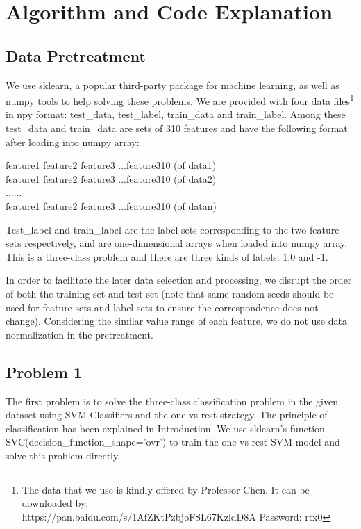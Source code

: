 \clearpage
\section{Algorithm and Code Explanation}

\subsection{Data Pretreatment}
We use sklearn, a popular third-party package for machine learning, as well as numpy tools to help solving these problems. We are provided with four data files\footnote{The data that we use is kindly offered by Professor Chen. It can be downloaded by:\\ https://pan.baidu.com/s/1AfZKtPzbjoFSL67KzldD8A \quad Password: rtx0} in npy format: test\_data, test\_label, train\_data and train\_label. Among these test\_data and train\_data are sets of 310 features and have the following format after loading into numpy array:

\begin{center}
feature1 feature2 feature3 ...feature310 (of data1)\\
feature1 feature2 feature3 ...feature310 (of data2)\\
......\\
feature1 feature2 feature3 ...feature310 (of datan)\\
\end{center}


Test\_label and train\_label are the label sets corresponding to the two feature sets respectively, and are one-dimensional arrays when loaded into numpy array. This is a three-class problem and there are three kinds of labels: 1,0 and -1.


In order to facilitate the later data selection and processing, we disrupt the order of both the training set and test set (note that same random seeds should be used for feature sets and label sets to ensure the correspondence does not change). Considering the similar value range of each feature, we do not use data normalization in the pretreatment.
\subsection{Problem 1}
The first problem is to solve the three-class classification problem in the given dataset using SVM Classifiers and the one-vs-rest strategy. The principle of classification has been explained in Introduction. We use sklearn's function SVC(decision\_function\_shape='ovr') to train the one-vs-rest SVM model and solve this problem directly.

